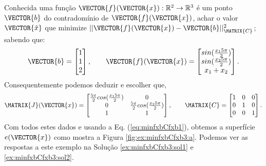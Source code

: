 \begin{example}
\label{ex:minfxbCfxb3}
Conhecida uma função $\VECTOR{f}(\VECTOR{x}) : \mathbb{R}^{2} \rightarrow \mathbb{R}^{3}$
é um ponto $\VECTOR{b}$ do contradomínio de $\VECTOR{f}(\VECTOR{x})$,
achar o valor $\VECTOR{\hat{x}}$ que minimize $||\VECTOR{f}(\VECTOR{x})-\VECTOR{b}||_{\MATRIX{C}}^2$;
sabendo que:
\begin{equation}
\VECTOR{b}=\begin{bmatrix}
1\\
1\\
2
\end{bmatrix},
\qquad 
\VECTOR{f}(\VECTOR{x})=\begin{bmatrix}
sin(\frac{x_1 5 \pi}{2})\\
sin(\frac{x_2 5 \pi}{2})\\
x_1+x_2
\end{bmatrix}.
\end{equation}
Consequentemente podemos deduzir e escolher que, 
\begin{equation}\label{eq:lab:ex2fx3}
\MATRIX{J}(\VECTOR{x})=\begin{bmatrix}
\frac{5 \pi}{2}cos(\frac{x_1 5 \pi}{2}) & 0\\
0 & \frac{5 \pi}{2}cos(\frac{x_2 5 \pi}{2}) \\
1 & 1
\end{bmatrix},
\qquad
\MATRIX{C}=\begin{bmatrix}
1 & 0 & 0\\
0 & 1 & 0\\
0 & 0 & 1
\end{bmatrix}.
\end{equation}
Com todos estes dados e usando a Eq. (\ref{eq:minfxbCfxb1}),
obtemos a superfície $e(\VECTOR{x})$ como mostra a Figura \ref{fig:ex:minfxbCfxb3:a}.
Podemos ver as respostas a este exemplo na Solução \ref{ex:minfxbCfxb3:sol1} e \ref{ex:minfxbCfxb3:sol2}.
\end{example}

